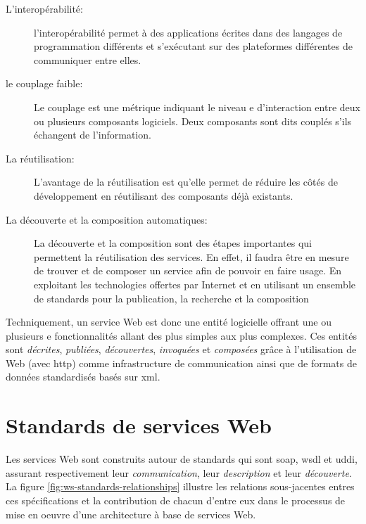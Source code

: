   \renewcommand{\descriptionlabel}[1]{\hspace{0.5cm}\textbullet~\textsf{#1}}
  \begin{description}
  \item [L'interopérabilité:] l'interopérabilité permet à des
    applications écrites dans des langages de programmation différents
    et s'exécutant sur des plateformes différentes de communiquer
    entre elles.

  \item [le couplage faible:] Le couplage est une métrique indiquant
    le niveau e d'interaction entre deux ou plusieurs composants
    logiciels. Deux composants sont dits couplés s'ils échangent de
    l'information.

  \item [La réutilisation:] L'avantage de la réutilisation est qu'elle
    permet de réduire les  côtés de développement en réutilisant
    des composants déjà existants.

  \item [La découverte et la composition automatiques:] La découverte
    et la composition sont des étapes importantes qui permettent la
    réutilisation des services. En effet, il faudra être en mesure de
    trouver et de composer un service afin de pouvoir en faire
    usage. En exploitant les technologies offertes par Internet et en
    utilisant un ensemble de standards pour la publication, la
    recherche et la composition
  \end{description}
  \enddescription


  Techniquement, un service Web est donc une entité logicielle offrant
  une ou plusieurs e fonctionnalités allant des plus simples aux plus
  complexes. Ces entités sont \emph{décrites}, \emph{publiées},
  \emph{découvertes}, \emph{invoquées} et \emph{composées} grâce à
  l'utilisation de Web (avec \acrshort{http}) comme infrastructure de
  communication ainsi que de formats de données standardisés basés sur
  \acrshort{xml}.
\newpage
\section{Standards de services Web}
\label{sec:reference-arch}
Les services Web sont construits autour de standards qui sont
\acrshort{soap}, \acrshort{wsdl} et \acrshort{uddi}, assurant
respectivement leur \emph{communication}, leur \emph{description} et
leur \emph{découverte}. La figure \ref{fig:ws-standards-relationships}
illustre les relations sous-jacentes entres ces spécifications et la
contribution de chacun d'entre eux dans le processus de mise en oeuvre
d'une architecture à base de services Web.

